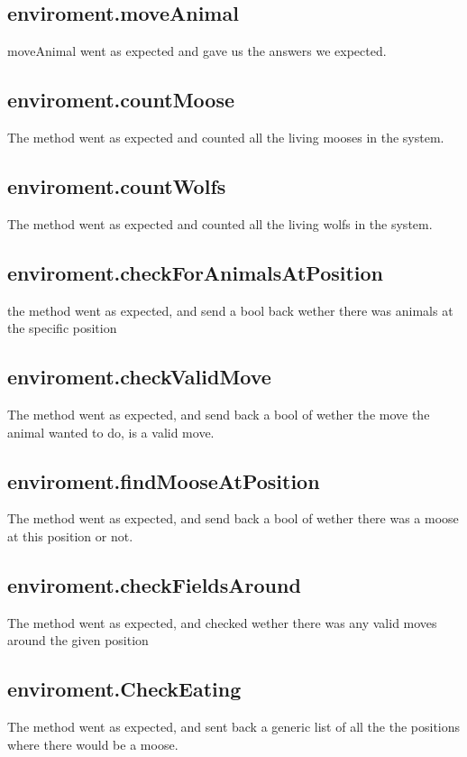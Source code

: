 \documentclass{article}
\begin{document}
    \subsection{enviroment.moveAnimal}
    moveAnimal went as expected and gave us the answers we expected.
    
    \subsection{enviroment.countMoose}
    The method went as expected and counted all the living mooses in the system.
    
    \subsection{enviroment.countWolfs}
    The method went as expected and counted all the living wolfs in the system.
    
    \subsection{enviroment.checkForAnimalsAtPosition}
    the method went as expected, and send a bool back wether there was animals at the specific position
    
    \subsection{enviroment.checkValidMove}
    The method went as expected, and send back a bool of wether the move the animal wanted to do, is a valid move.
    
    \subsection{enviroment.findMooseAtPosition}
    The method went as expected, and send back a bool of wether there was a moose at this position or not.
    
    \subsection{enviroment.checkFieldsAround}
    The method went as expected, and checked wether there was any valid moves around the given position
    
    \subsection{enviroment.CheckEating}
    The method went as expected, and sent back a generic list of all the the positions where there would be a moose.
    
\end{document}
